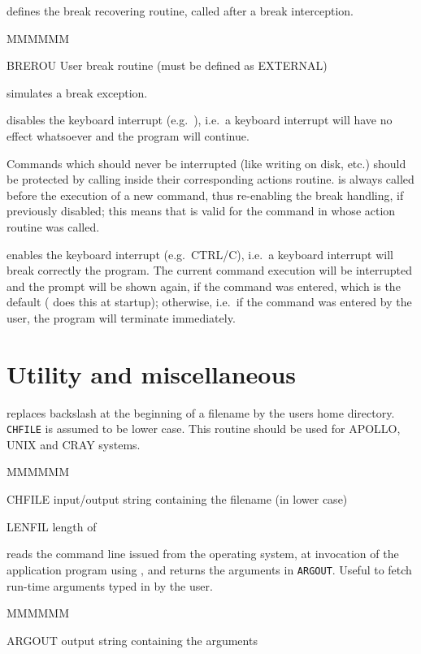 \Action defines the break recovering routine, called after a break interception.
\Pdesc\begin{DLtt}{MMMMMM}
\item[BREROU] User break routine (must be defined as EXTERNAL)
\end{DLtt}

\Action simulates a break exception.

\Vskip{}
\Action disables the keyboard interrupt (e.g.\ ),
i.e.\ a keyboard interrupt
will have no effect whatsoever and the program will continue.

Commands which should never be interrupted (like writing on disk, etc.)
should be protected by calling  inside their
corresponding actions routine.
 is always called before the execution of a new command,
thus re-enabling the break handling, if previously disabled;
this means that  is valid for the command in whose action
routine  was called.

\Vskip{}
\Action enables the keyboard interrupt (e.g.\ CTRL/C),
i.e.\ a keyboard interrupt
will break correctly the program.
The current command execution will be interrupted and the prompt
will be shown again, if the command  was entered,
which is the default ( does this at startup);
otherwise, i.e.\ if the command  was entered by the user,
the program will terminate immediately.
\section{Utility and miscellaneous}

\Action replaces backslash
at the beginning of a filename by the users home
directory. {\tt CHFILE} is assumed to be lower case.
This routine should be used for APOLLO, UNIX and CRAY systems.
\Pdesc\begin{DLtt}{MMMMMM}
\item[CHFILE] input/output string containing the filename (in lower case)
\item[LENFIL] length of 
\end{DLtt}

\Action reads the command line issued from the operating system,
at invocation of the application program using \KUIP{},
and returns the arguments in {\tt ARGOUT}.  
Useful to fetch run-time arguments typed in by the user.
\Pdesc\begin{DLtt}{MMMMMM}
\item[ARGOUT] output string containing the arguments
\end{DLtt}

